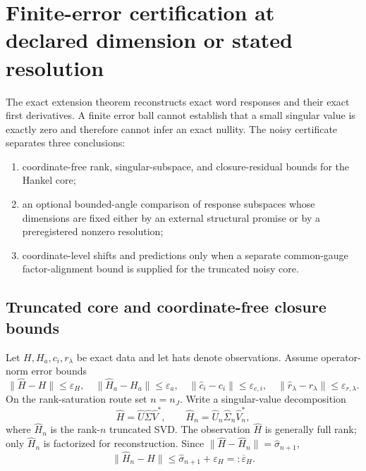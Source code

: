 \documentclass[aps,prl,onecolumn,superscriptaddress,nofootinbib]{revtex4-2}
\newcommand{\eps}{\varepsilon}
\begin{document}
\section{Finite-error certification at declared dimension or stated resolution}
\label{sec:perturbed}

The exact extension theorem reconstructs exact word responses and their exact first derivatives.  A finite error ball cannot establish that a small singular value is exactly zero and therefore cannot infer an exact nullity.  The noisy certificate separates three conclusions:
\begin{enumerate}
\item coordinate-free rank, singular-subspace, and closure-residual bounds for the Hankel core;
\item an optional bounded-angle comparison of response subspaces whose dimensions are fixed either by an external structural promise or by a preregistered nonzero resolution;
\item coordinate-level shifts and predictions only when a separate common-gauge factor-alignment bound is supplied for the truncated noisy core.
\end{enumerate}

\subsection{Truncated core and coordinate-free closure bounds}

Let $H,H_a,c_i,r_\lambda$ be exact data and let hats denote observations.  Assume operator-norm error bounds
\begin{equation}
 \|\widehat H-H\|\le\eps_H,
 \quad \|\widehat H_a-H_a\|\le\eps_a,
 \quad \|\widehat c_i-c_i\|\le\eps_{c,i},
 \quad \|\widehat r_\lambda-r_\lambda\|\le\eps_{r,\lambda}.
 \label{eq:data-errors}
\end{equation}
On the rank-saturation route set $n=n_J$.  Write a singular-value decomposition
\begin{equation}
 \widehat H=\widehat U\widehat\Sigma\widehat V^*,
 \qquad
 \widehat H_n=\widehat U_n\widehat\Sigma_n\widehat V_n^*,
 \label{eq:H-truncation}
\end{equation}
where $\widehat H_n$ is the rank-$n$ truncated SVD.  The observation $\widehat H$ is generally full rank; only $\widehat H_n$ is factorized for reconstruction.  Since
$\|\widehat H-\widehat H_n\|=\widehat\sigma_{n+1}$,
\begin{equation}
 \|\widehat H_n-H\|
 \le \widehat\sigma_{n+1}+\eps_H
 =:\overline\eps_H.
 \label{eq:truncated-core-error}
\end{equation}
\end{document}

